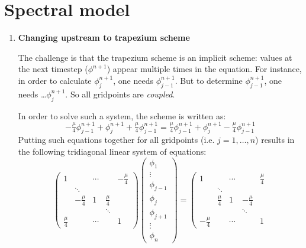 \documentclass[a4paper,fleqn]{article}
\begin{document}
\section{Spectral model}
%
\begin{enumerate}
	\item \textbf{Changing upstream to trapezium scheme}
		\par
		The challenge is that the trapezium scheme is an implicit scheme: values at the next timestep ($\phi^{n+1}$) appear multiple times in the equation. For instance, in order to calculate $\phi^{n+1}_j$, one needs $\phi^{n+1}_{j-1}$. But to determine $\phi^{n+1}_{j-1}$, one needs \ldots $\phi^{n+1}_j$. So all gridpoints are \emph{coupled}.
		\par
		In order to solve such a system, the scheme is written as:
		\begin{equation*}
			-\tfrac{\mu}{4}\phi_{j-1}^{n+1}+\phi_j^{n+1}+\tfrac{\mu}{4}\phi_{j-1}^{n+1} = \tfrac{\mu}{4}\phi_{j-1}^{n+1}+\phi_j^{n+1}-\tfrac{\mu}{4}\phi_{j-1}^{n+1}
		\end{equation*}
		Putting such equations together for all gridpoints (i.e. $j=1,\ldots,n$) results in the following tridiagonal linear system of equations:
		\begin{equation*}
			\left(\begin{array}{ccccc}
				1 & & \cdots & & -\tfrac{\mu}{4}	\\
				&\ddots&&&	\\
					& -\tfrac{\mu}{4}	&	1	&	\tfrac{\mu}{4}	&	\\
				&&&\ddots&\\
				\tfrac{\mu}{4}	&&	\cdots	&&	1
			\end{array}\right)
			\left(\begin{array}{c}
				\phi_1	\\	\vdots \\	\phi_{j-1}	\\	\phi_{j}	\\	\phi_{j+1}	\\	\vdots \\ \phi_n
			\end{array}\right)
			=
			\left(\begin{array}{ccccc}
				1 & & \cdots & & \tfrac{\mu}{4}	\\
				&\ddots&&&	\\
					& \tfrac{\mu}{4}	&	1	&	-\tfrac{\mu}{4}	&	\\
				&&&\ddots&\\
				-\tfrac{\mu}{4}	&&	\cdots	&&	1

\end{array}
\end{equation*}
\end{enumerate}
\end{document}
